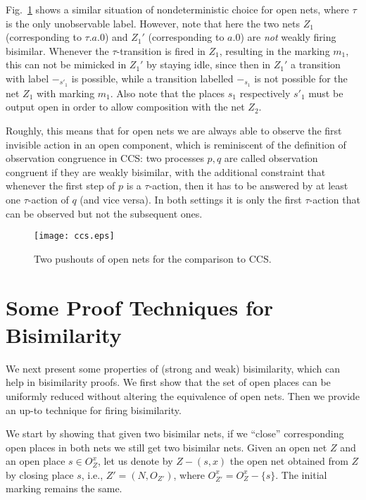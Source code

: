 \documentclass{LMCS}
\begin{document}
Fig.~\ref{fi:open-nets-ccs} shows a similar situation of
nondeterministic choice for open nets, where $\tau$ is the only
unobservable label.  However, note that here the two nets $Z_1$
(corresponding to $\tau.a.0$) and $Z_1'$ (corresponding to $a.0$) are
\emph{not} weakly firing bisimilar. Whenever the $\tau$-transition is
fired in $Z_1$, resulting in the marking $m_1$, this can not be
mimicked in $Z_1'$ by staying idle, since then in $Z_1'$ a transition
with label $-_{s'_1}$ is possible, while a transition labelled
$-_{s_1}$ is not possible for the net $Z_1$ with marking $m_1$.  Also
note that the places $s_1$ respectively $s'_1$ must be output open in
order to allow composition with the net $Z_2$.

Roughly, this means that for open nets we are always able to observe
the first invisible action in an open component, which is reminiscent
of the definition of observation congruence 
in CCS: two processes $p,q$ are called observation congruent if they
are weakly bisimilar, with the additional constraint that whenever the
first step of $p$ is a $\tau$-action, then it has to be answered by at
least one $\tau$-action of $q$ (and vice versa). In both settings it
is only the first $\tau$-action that can be observed but not the
subsequent ones.

\begin{figure}[t]
  \begin{center}
    \texttt{[image: ccs.eps]}
  \end{center}
  \caption{Two pushouts of open nets for the comparison to CCS.}

  \label{fi:open-nets-ccs}
\end{figure}


\section{Some Proof Techniques for Bisimilarity}
\label{sec:proof-techniques}


We next present some properties of (strong and weak) bisimilarity,
which can help in bisimilarity proofs. We first show that the set of
open places can be uniformly reduced without altering the equivalence
of open nets. Then we provide an up-to technique for firing
bisimilarity.



We start by showing that given two bisimilar nets, if we ``close'' 
corresponding open places in both nets we still get two bisimilar nets.
Given an open net $Z$ and an open place $s \in O_Z^x$, let us denote
by $Z-(s,x)$ the open net obtained from $Z$ by closing place $s$,
i.e., $Z' = (N, O_{Z'})$, where $O_{Z'}^x = O_Z^x -\{s\}$.
The initial marking remains the same.
\end{document}
